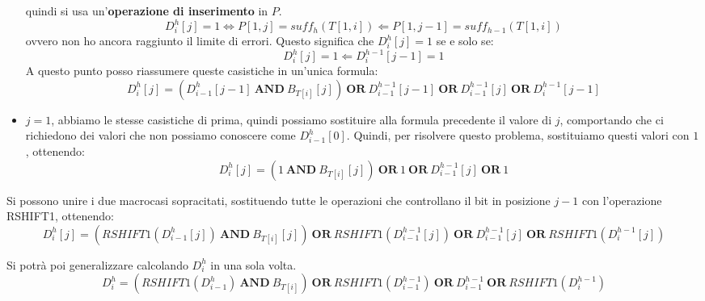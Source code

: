 \begin{itemize}
          quindi si usa un'\textbf{operazione di inserimento} in $P$.
          \begin{equation}
              D_i^h[j] = 1 \iff P[1, j] =suff_h(T[1, i]) \Leftarrow P[1, j - 1] = suff_{h - 1}(T[1, i])
          \end{equation}
          ovvero non ho ancora raggiunto il limite di errori. Questo significa che $D_i^h[j] = 1$
          se e solo se:
          \begin{equation}
              D_i^h[j] = 1 \Leftarrow D_{i}^{h - 1} [j - 1] = 1
          \end{equation}
          A questo punto posso riassumere queste casistiche in un'unica formula:
          \begin{equation}
              D_{i}^{h} [j] = (D_{i - 1}^{h} [j - 1] \ \textbf{AND} \ B_{T[i]} [j]) \
              \textbf{OR} \ D_{i - 1}^{h - 1} [j - 1] \ \textbf{OR} \ D_{i - 1}^{h - 1} [j]
              \ \textbf{OR} \ D_{i}^{h - 1} [j - 1]
          \end{equation}
    \item  $j = 1$, abbiamo le stesse casistiche di prima, quindi possiamo sostituire
          alla formula precedente il valore di $j$, comportando che ci richiedono dei valori
          che non possiamo conoscere come $D_{i -1}^h[0]$. Quindi, per risolvere questo
          problema, sostituiamo questi valori con $1$, ottenendo:
          \begin{equation}
              D_{i}^{h} [j] = (1 \ \textbf{AND} \ B_{T[i]} [j]) \ \textbf{OR} \ 1 \
              \textbf{OR} \ D_{i - 1}^{h - 1} [j] \ \textbf{OR} \ 1
          \end{equation}
\end{itemize}

Si possono unire i due macrocasi sopracitati, sostituendo tutte le operazioni che
controllano il bit in posizione $j - 1$ con l'operazione RSHIFT1, ottenendo:
\begin{equation}
    D_{i}^{h} [j] = (RSHIFT1(D_{i - 1}^{h} [j]) \ \textbf{AND} \ B_{T[i]} [j]) \
    \textbf{OR} \ RSHIFT1(D_{i - 1}^{h - 1} [j])  \ \textbf{OR} \ D_{i - 1}^{h - 1} [j] \
    \textbf{OR} \ RSHIFT1(D_{i}^{h - 1} [j])
\end{equation}

Si potrà poi generalizzare calcolando $D_i^h$ in una sola volta.
\begin{equation}
    D_{i}^{h}= (RSHIFT1(D_{i - 1}^{h}) \ \textbf{AND} \ B_{T[i]}) \
    \textbf{OR} \ RSHIFT1(D_{i - 1}^{h - 1})  \ \textbf{OR} \ D_{i - 1}^{h - 1} \
    \textbf{OR} \ RSHIFT1(D_{i}^{h - 1})
\end{equation}

